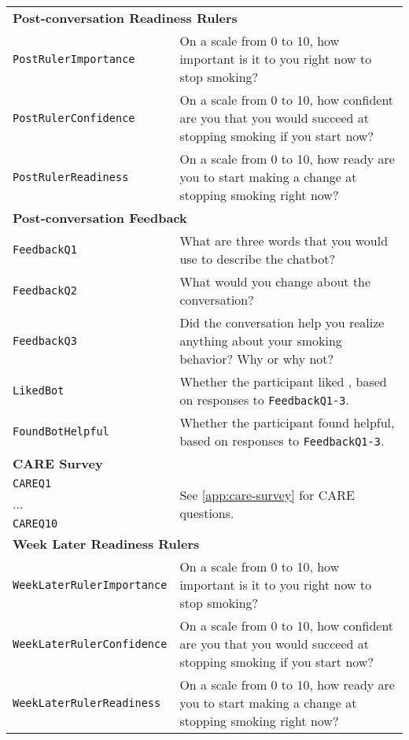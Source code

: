 \begin{longtable}{l p{10cm}}
\multicolumn{2}{l}{\textbf{Post-conversation Readiness Rulers}} \\
\texttt{PostRulerImportance} & On a scale from 0 to 10, how important is it to you right now to stop smoking?\\
\texttt{PostRulerConfidence} & On a scale from 0 to 10, how confident are you that you would succeed at stopping smoking if you start now?\\
\texttt{PostRulerReadiness} & On a scale from 0 to 10, how ready are you to start making a change at stopping smoking right now?\\
\midrule

\multicolumn{2}{l}{\textbf{Post-conversation Feedback}} \\
\texttt{FeedbackQ1} & What are three words that you would use to describe the chatbot?\\
\texttt{FeedbackQ2} & What would you change about the conversation?\\
\texttt{FeedbackQ3} & Did the conversation help you realize anything about your smoking behavior? Why or why not?\\
\texttt{LikedBot} & Whether the participant liked \sysname{}, based on responses to \texttt{Feedback\-Q1-3}.\\
\texttt{FoundBotHelpful} & Whether the participant found \sysname{} helpful, based on responses to \texttt{Feedback\-Q1-3}.\\
\midrule

\multicolumn{2}{l}{\textbf{CARE Survey}} \\
\texttt{CAREQ1} & \multirow{3}{*}{See \cref{app:care-survey} for CARE questions.}\\
... & \\
\texttt{CAREQ10} & \\
\midrule



\multicolumn{2}{l}{\textbf{Week Later Readiness Rulers}} \\
\texttt{WeekLaterRulerImportance} & On a scale from 0 to 10, how important is it to you right now to stop smoking?\\
\texttt{WeekLaterRulerConfidence} & On a scale from 0 to 10, how confident are you that you would succeed at stopping smoking if you start now?\\
\texttt{WeekLaterRulerReadiness} & On a scale from 0 to 10, how ready are you to start making a change at stopping smoking right now?\\
\midrule


\end{longtable}
